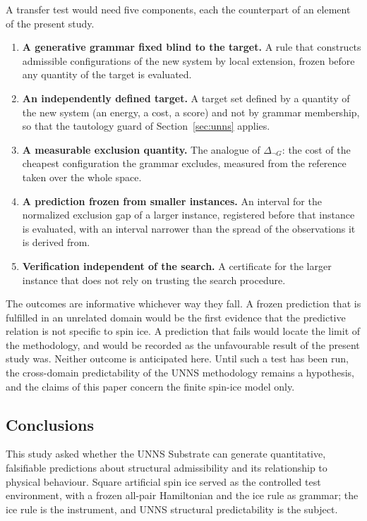 \documentclass[11pt,a4paper]{article}
\theoremstyle{plain}
\theoremstyle{definition}
\theoremstyle{remark}
\begin{document}
A transfer test would need five components, each the counterpart of an element of the present study.
\begin{enumerate}[leftmargin=2.2em,itemsep=0.1em]
\item \textbf{A generative grammar fixed blind to the target.} A rule that constructs admissible configurations of the new system by local extension, frozen before any quantity of the target is evaluated.
\item \textbf{An independently defined target.} A target set defined by a quantity of the new system (an energy, a cost, a score) and not by grammar membership, so that the tautology guard of Section~\ref{sec:unns} applies.
\item \textbf{A measurable exclusion quantity.} The analogue of $\Delta_{\neg G}$: the cost of the cheapest configuration the grammar excludes, measured from the reference taken over the whole space.
\item \textbf{A prediction frozen from smaller instances.} An interval for the normalized exclusion gap of a larger instance, registered before that instance is evaluated, with an interval narrower than the spread of the observations it is derived from.
\item \textbf{Verification independent of the search.} A certificate for the larger instance that does not rely on trusting the search procedure.
\end{enumerate}
The outcomes are informative whichever way they fall. A frozen prediction that is fulfilled in an unrelated domain would be the first evidence that the predictive relation is not specific to spin ice. A prediction that fails would locate the limit of the methodology, and would be recorded as the unfavourable result of the present study was. Neither outcome is anticipated here. Until such a test has been run, the cross-domain predictability of the UNNS methodology remains a hypothesis, and the claims of this paper concern the finite spin-ice model only.

\subsection{Conclusions}
This study asked whether the UNNS Substrate can generate quantitative, falsifiable predictions about structural admissibility and its relationship to physical behaviour. Square artificial spin ice served as the controlled test environment, with a frozen all-pair Hamiltonian and the ice rule as grammar; the ice rule is the instrument, and UNNS structural predictability is the subject.
\end{document}

